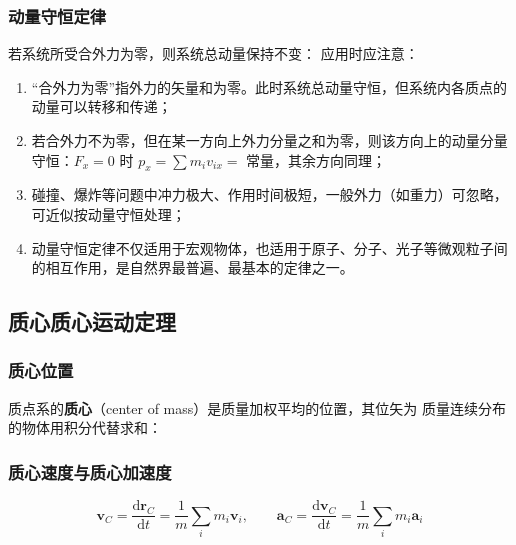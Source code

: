         \subsubsection{动量守恒定律}
        若系统所受合外力为零，则系统总动量保持不变：
        应用时应注意：
        \begin{enumerate}
            \item “合外力为零”指外力的矢量和为零。此时系统总动量守恒，但系统内各质点的动量可以转移和传递；
            \item 若合外力不为零，但在某一方向上外力分量之和为零，则该方向上的动量分量守恒：$F_{x}=0$ 时 $p_{x}=\sum m_{i}v_{ix}=$ 常量，其余方向同理；
            \item 碰撞、爆炸等问题中冲力极大、作用时间极短，一般外力（如重力）可忽略，可近似按动量守恒处理；
            \item 动量守恒定律不仅适用于宏观物体，也适用于原子、分子、光子等微观粒子间的相互作用，是自然界最普遍、最基本的定律之一。
        \end{enumerate}

    \subsection{质心\texorpdfstring{\hspace{0.5em}}{ }质心运动定理}
        \subsubsection{质心位置}
        质点系的\textbf{质心}（center of mass）是质量加权平均的位置，其位矢为
        质量连续分布的物体用积分代替求和：

        \subsubsection{质心速度与质心加速度}
        \[
        \boldsymbol{v}_{C}=\frac{\mathrm{d}\boldsymbol{r}_{C}}{\mathrm{d}t}=\frac{1}{m}\sum_{i}m_{i}\boldsymbol{v}_{i},
        \qquad
        \boldsymbol{a}_{C}=\frac{\mathrm{d}\boldsymbol{v}_{C}}{\mathrm{d}t}=\frac{1}{m}\sum_{i}m_{i}\boldsymbol{a}_{i}
        \]

